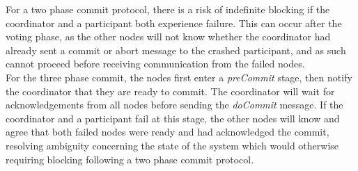 \documentclass[12pt]{article}
\begin{document}
For a two phase commit protocol, there is a risk of indefinite blocking if the coordinator and a participant both experience failure. This can occur after the voting phase, as the other nodes will not know whether the coordinator had already sent a commit or abort message to the crashed participant, and as such cannot proceed before receiving communication from the failed nodes. \\
For the three phase commit, the nodes first enter a \emph{preCommit} stage, then notify the coordinator that they are ready to commit. The coordinator will wait for acknowledgements from all nodes before sending the \emph{doCommit} message. If the coordinator and a participant fail at this stage, the other nodes will know and agree that both failed nodes were ready and had acknowledged the commit, resolving ambiguity concerning the state of the system which would otherwise requiring blocking following a two phase commit protocol.
\end{document}
